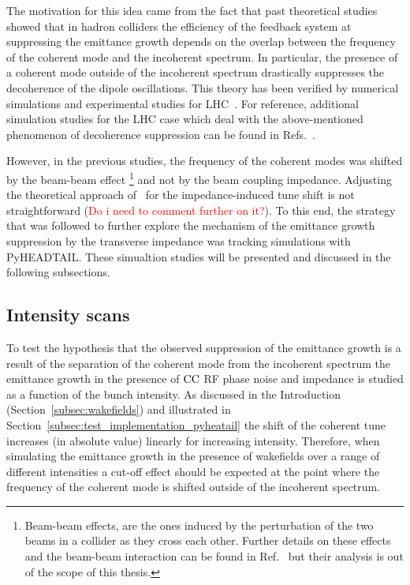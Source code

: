 The motivation for this idea came from the fact that past theoretical studies~\cite{Alexahin:314169, Alexahin:485304} showed that in hadron colliders the efficiency of the feedback system at suppressing the emittance growth depends on the overlap between the frequency of the coherent mode and the incoherent spectrum. In particular, the presence of a coherent mode outside of the incoherent spectrum drastically suppresses the decoherence of the dipole oscillations. This theory has been verified by numerical simulations and experimental studies for LHC~\cite{QIANG201853, PhysRevAccelBeams.23.021002, PhysRevAccelBeams.24.011003}. %
For reference, additional simulation studies for the LHC case which deal with the above-mentioned phenomenon of decoherence suppression can be found in Refs.~\cite{Alexahin:497415, Herr:486007}. 

However, in the previous studies, the frequency of the coherent modes was shifted by the beam-beam effect \footnote{Beam-beam effects, are the ones induced by the perturbation of the two beams in a collider as they cross each other. Further details on these effects and the beam-beam interaction can be found in Ref.~\cite{Herr:1982430} but their analysis is out of the scope of this thesis.} and not by the beam coupling impedance. Adjusting the theoretical approach of~\cite{Alexahin:314169} for the impedance-induced tune shift is not straightforward (\textcolor{red}{Do i need to comment further on it?}). To this end, the strategy that was followed to further explore the mechanism of the emittance growth suppression by the transverse impedance was tracking simulations with PyHEADTAIL. These simualtion studies will be presented and discussed in the following subsections.


\subsection{Intensity scans}\label{subsec:intensity_scan_emit_growth}
To test the hypothesis that the observed suppression of the emittance growth is a result of the separation of the coherent mode from the incoherent spectrum the emittance growth in the presence of ${\mathrm{CC}}$ RF phase noise and impedance is studied as a function of the bunch intensity. As discussed in the Introduction (Section~\ref{subsec:wakefields}) and illustrated in Section~\ref{subsec:test_implementation_pyheatail} the shift of the coherent tune increases (in absolute value) linearly for increasing intensity. Therefore, when simulating the emittance growth in the presence of wakefields over a range of different intensities a cut-off effect should be expected at the point where the frequency of the coherent mode is shifted outside of the incoherent spectrum.

